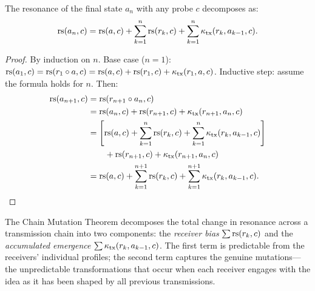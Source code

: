\begin{theorem}\label{thm:chain-mutation}
The resonance of the final state $a_n$ with any probe $c$ decomposes as:
\[
    \mathrm{rs}(a_n, c) = \mathrm{rs}(a, c) + \sum_{k=1}^n \mathrm{rs}(r_k, c)
    + \sum_{k=1}^n \kappa_{\mathrm{tx}}(r_k, a_{k-1}, c).
\]
\end{theorem}
\begin{proof}
By induction on $n$. Base case ($n=1$):
$\mathrm{rs}(a_1, c) = \mathrm{rs}(r_1 \circ a, c) = \mathrm{rs}(a,c) + \mathrm{rs}(r_1,c)
+ \kappa_{\mathrm{tx}}(r_1, a, c)$. Inductive step: assume the
formula holds for $n$. Then:
\begin{align*}
    \mathrm{rs}(a_{n+1}, c) &= \mathrm{rs}(r_{n+1} \circ a_n, c) \\
    &= \mathrm{rs}(a_n, c) + \mathrm{rs}(r_{n+1}, c)
       + \kappa_{\mathrm{tx}}(r_{n+1}, a_n, c) \\
    &= \left[\mathrm{rs}(a,c) + \sum_{k=1}^n \mathrm{rs}(r_k,c)
       + \sum_{k=1}^n \kappa_{\mathrm{tx}}(r_k, a_{k-1}, c)\right] \\
    &\qquad + \mathrm{rs}(r_{n+1}, c)
       + \kappa_{\mathrm{tx}}(r_{n+1}, a_n, c) \\
    &= \mathrm{rs}(a,c) + \sum_{k=1}^{n+1} \mathrm{rs}(r_k,c)
       + \sum_{k=1}^{n+1} \kappa_{\mathrm{tx}}(r_k, a_{k-1}, c).
\end{align*}
\end{proof}

\begin{interpretation}
The Chain Mutation Theorem decomposes the total change in resonance
across a transmission chain into two components: the \emph{receiver
bias} $\sum \mathrm{rs}(r_k, c)$ and the \emph{accumulated emergence}
$\sum \kappa_{\mathrm{tx}}(r_k, a_{k-1}, c)$. The first term is
predictable from the receivers' individual profiles; the second term
captures the genuine mutations---the unpredictable transformations
that occur when each receiver engages with the idea as it has been
shaped by all previous transmissions.
\end{interpretation}

